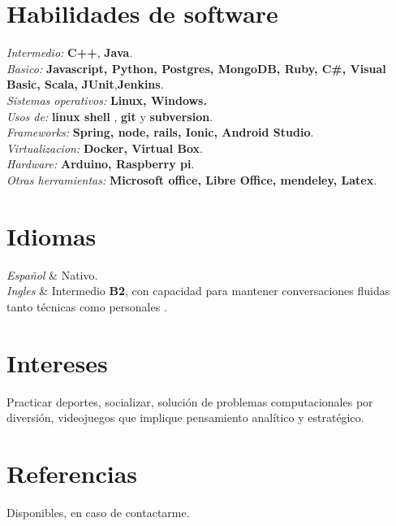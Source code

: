 \documentclass[
    changecolor={111, 156, 45}, 
]{cv-roald}
\begin{document}
\section*{Habilidades de software}
	\textit{Intermedio:}  \textbf{C++}, \textbf{Java}.\\
	\textit{Basico:} \textbf{Javascript, Python, Postgres, MongoDB, Ruby, C\#, Visual Basic, Scala,}  \textbf{JUnit},\textbf{Jenkins}.\\
	\textit{Sistemas operativos:} \textbf{Linux, Windows.}\\
	\textit{Usos de:} \textbf{linux shell} , \textbf{git} y \textbf{subversion}.\\
	\textit{Frameworks:} \textbf{Spring, node, rails, Ionic, Android Studio}. \\
	\textit{Virtualizacion:} \textbf{Docker, Virtual Box}.\\
	\textit{Hardware:} \textbf{Arduino, Raspberry pi}.\\
	\textit{Otras herramientas:} \textbf{Microsoft office, Libre Office, mendeley, Latex}.

\section*{Idiomas}
\begin{tabularcv}
\textit{Español}     &	Nativo. \\
\textit{Ingles}      &  Intermedio \textbf{B2}, con capacidad para mantener conversaciones fluidas tanto técnicas como personales .\\
\end{tabularcv}

\section*{Intereses}
Practicar deportes, socializar, solución de problemas computacionales por diversión, videojuegos que implique pensamiento analítico y estratégico.

\section*{Referencias}
Disponibles, en caso de contactarme.
    
\end{document}
